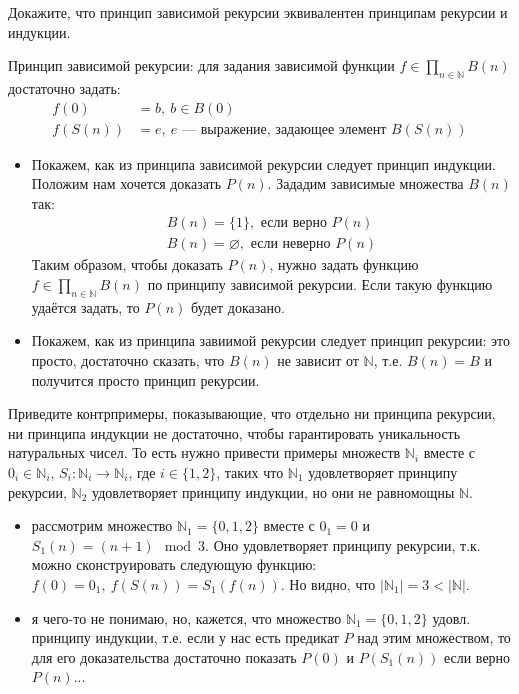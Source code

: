 \begin{task}[2]
Докажите, что принцип зависимой рекурсии эквивалентен принципам рекурсии и индукции.
\end{task}
\begin{solution}
Принцип зависимой рекурсии: для задания зависимой функции $f \in \prod_{n \in \mathbb{N}}{B(n)}$ достаточно задать:
\begin{align*}
	f(0) &= b,\ b \in B(0)\\
	f(S(n)) &= e,\ e \text{ --- выражение, задающее элемент } B(S(n))
\end{align*}
\begin{itemize}
	\item Покажем, как из принципа зависимой рекурсии следует принцип индукции. Положим нам хочется доказать $P(n)$. Зададим зависимые множества $B(n)$ так:
	\[
		\begin{array}{l}
		B(n) = \{ 1\},\text{ если верно } P(n)\\
		B(n) = \varnothing,\text{ если неверно } P(n)
		\end{array}
	\]
	Таким образом, чтобы доказать $P(n)$, нужно задать функцию $f \in \prod_{n \in \mathbb{N}}{B(n)}$ по принципу зависимой рекурсии. Если такую функцию удаётся задать, то $P(n)$ будет доказано.
	\item Покажем, как из принципа завиимой рекурсии следует принцип рекурсии: это просто, достаточно сказать, что $B(n)$ не зависит от $\mathbb{N}$, т.е. $B(n) = B$ и получится просто принцип рекурсии.
	\xqed
\end{itemize}
\end{solution}

\begin{task}[3]
Приведите контрпримеры, показывающие, что отдельно ни принципа рекурсии, ни принципа индукции не достаточно, чтобы гарантировать уникальность натуральных чисел.
    То есть нужно привести примеры множеств $\mathbb{N}_i$ вместе с $0_i \in \mathbb{N}_i$, $S_i : \mathbb{N}_i \to \mathbb{N}_i$, где $i \in \{ 1, 2 \}$,
    таких что $\mathbb{N}_1$ удовлетворяет принципу рекурсии, $\mathbb{N}_2$ удовлетворяет принципу индукции, но они не равномощны $\mathbb{N}$.
\end{task}
\begin{solution}
\begin{itemize}
	\item рассмотрим множество $\mathbb{N}_1 = \{ 0, 1, 2\}$ вместе с $0_1 = 0$ и $S_1(n) = (n + 1)\mod 3$. Оно удовлетворяет принципу рекурсии, т.к. можно сконструировать следующую функцию: $f(0) = 0_1,\ f(S(n)) = S_1(f(n))$. Но видно, что $|\mathbb{N}_1| = 3 < |\mathbb{N}|$.
	\item я чего-то не понимаю, но, кажется, что множество $\mathbb{N}_1 = \{ 0, 1, 2\}$ удовл. принципу индукции, т.е. если у нас есть предикат $P$ над этим множеством, то для его доказательства достаточно показать $P(0)$ и $P(S_1(n))$ если верно $P(n)$...
	\xqed
\end{itemize}
\end{solution}

